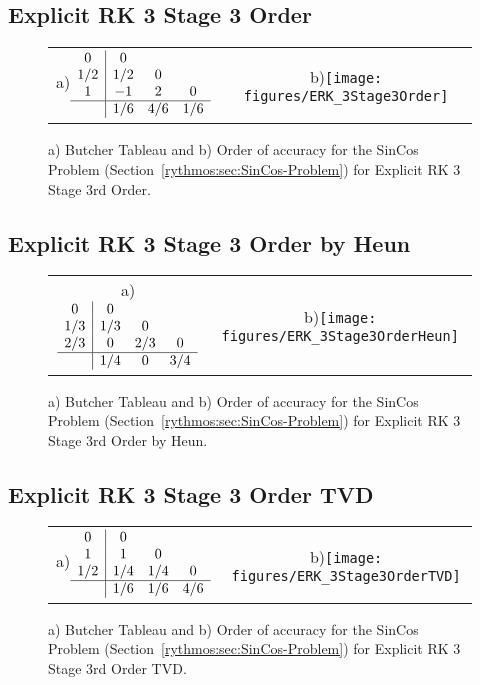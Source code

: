 \subsection{Explicit RK 3 Stage 3 Order}

\begin{figure}[H]
\centering{}%
\begin{tabular}{cc}
a)$\begin{array}{c|ccc}
0 & 0\\
1/2 & 1/2 & 0\\
1 & -1 & 2 & 0\\
\hline  & 1/6 & 4/6 & 1/6
\end{array}$ & b)\texttt{[image: figures/ERK\_3Stage3Order]}\tabularnewline
\end{tabular}\caption{a) Butcher Tableau and b) Order of accuracy for the SinCos Problem
(Section~\ref{rythmos:sec:SinCos-Problem}) for Explicit RK 3 Stage
3rd Order.\label{rythmos:tab:ButcherTableau-ERK_3Stage3Order}}
\end{figure}


\subsection{Explicit RK 3 Stage 3 Order by Heun}

\begin{figure}[H]
\centering{}%
\begin{tabular}{cc}
a) $\begin{array}{c|ccc}
0 & 0\\
1/3 & 1/3 & 0\\
2/3 & 0 & 2/3 & 0\\
\hline  & 1/4 & 0 & 3/4
\end{array}$ & b)\texttt{[image: figures/ERK\_3Stage3OrderHeun]}\tabularnewline
\end{tabular}\caption{a) Butcher Tableau and b) Order of accuracy for the SinCos Problem
(Section~\ref{rythmos:sec:SinCos-Problem}) for Explicit RK 3 Stage
3rd Order by Heun.\label{rythmos:tab:ButcherTableau-ERK_3Stage3OrderHeun}}
\end{figure}


\subsection{Explicit RK 3 Stage 3 Order TVD}

\begin{figure}[H]
\centering{}%
\begin{tabular}{cc}
a)$\begin{array}{c|ccc}
0 & 0\\
1 & 1 & 0\\
1/2 & 1/4 & 1/4 & 0\\
\hline  & 1/6 & 1/6 & 4/6
\end{array}$ & b)\texttt{[image: figures/ERK\_3Stage3OrderTVD]}\tabularnewline
\end{tabular}\caption{a) Butcher Tableau and b) Order of accuracy for the SinCos Problem
(Section~\ref{rythmos:sec:SinCos-Problem}) for Explicit RK 3 Stage
3rd Order TVD.\label{rythmos:tab:ButcherTableau-ERK_3Stage3OrderTVD}}
\end{figure}


